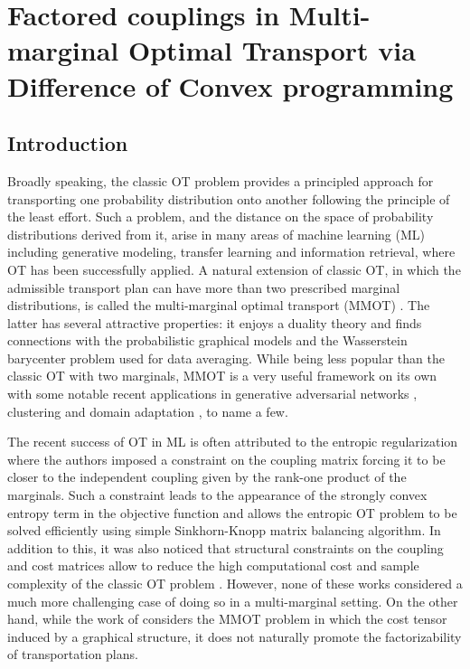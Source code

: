 \section{Factored couplings in Multi-marginal Optimal
Transport via Difference of Convex programming} \label{subsec:MMOT_DC}

\subsection{Introduction}

Broadly speaking, the classic OT problem provides a principled approach for transporting one probability distribution onto another
following the principle of the least effort. Such a problem, and the distance on the space of probability distributions derived from it,
arise in many areas of machine learning (ML) including generative modeling, transfer learning and information retrieval, where OT has
been successfully applied. A natural extension of classic OT, in which the admissible transport plan can have more
than two prescribed marginal distributions, is called the multi-marginal optimal transport (MMOT) \citep{Gangbo98}.
The latter has several attractive properties: it enjoys a duality theory \citep{Kellerer84} and finds connections with the
probabilistic graphical models \citep{Haasler20} and the Wasserstein barycenter problem \citep{Agueh11} used for data averaging.
While being less popular than the classic OT with two marginals, MMOT is a very useful framework on its own with some notable recent
applications in generative adversarial networks \citep{Cao19}, clustering \citep{Mi21} and domain adaptation
\citep{HuiLCHY18,HeZKSC19}, to name a few.

The recent success of OT in ML is often attributed to the entropic regularization \citep{Cuturi13} where the authors imposed a
constraint on the coupling matrix forcing it to be closer to the independent coupling given by the rank-one product of the marginals.
Such a constraint leads to the appearance of the strongly convex entropy term in the objective function and allows the entropic
OT problem to be solved efficiently using simple Sinkhorn-Knopp matrix balancing algorithm. In addition to this, it was also noticed
that structural constraints on the coupling and cost matrices allow to reduce the high computational cost and sample complexity
of the classic OT problem \citep{Genevay19,Forrow18,Chiheng21,Meyer21a}. However, none of these works considered a much more
challenging case of doing so in a multi-marginal setting. On the other hand, while the work of \citep{Haasler20} considers the MMOT
problem in which the cost tensor induced by a graphical structure, it does not naturally promote the factorizability of
transportation plans.

